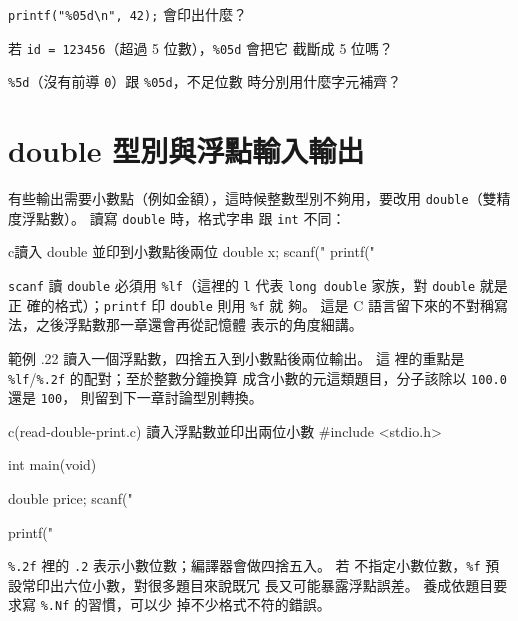 
\begin{drills}[label=drills:basic-width-padding]
\item \texttt{printf("\%05d\textbackslash n", 42);} 會印出什麼？
\item 若 \texttt{id = 123456}（超過 5 位數），\texttt{\%05d} 會把它
截斷成 5 位嗎？
\item \texttt{\%5d}（沒有前導 \texttt{0}）跟 \texttt{\%05d}，不足位數
時分別用什麼字元補齊？
\end{drills}

\section{double 型別與浮點輸入輸出}
\label{sec:basic-double}

有些輸出需要小數點（例如金額），這時候整數型別不夠用，要改用
\texttt{double}（雙精度浮點數）。 讀寫 \texttt{double} 時，格式字串
跟 \texttt{int} 不同：

\begin{code}{c}{讀入 double 並印到小數點後兩位}
double x;
scanf("%
printf("%
\end{code}

\texttt{scanf} 讀 \texttt{double} 必須用 \texttt{\%lf}（這裡的
\texttt{l} 代表 \texttt{long double} 家族，對 \texttt{double} 就是正
確的格式）；\texttt{printf} 印 \texttt{double} 則用 \texttt{\%f} 就
夠。 這是 C 語言留下來的不對稱寫法，之後浮點數那一章還會再從記憶體
表示的角度細講。

範例 \thechapter.22 讀入一個浮點數，四捨五入到小數點後兩位輸出。 這
裡的重點是 \texttt{\%lf}/\texttt{\%.2f} 的配對；至於整數分鐘換算
成含小數的元這類題目，分子該除以 \texttt{100.0} 還是 \texttt{100}，
則留到下一章討論型別轉換。

\begin{example}{c}{(read-double-print.c) 讀入浮點數並印出兩位小數}
#include <stdio.h>

int main(void) {
    double price;
    scanf("%

    printf("%
}
\end{example}


\texttt{\%.2f} 裡的 \texttt{.2} 表示小數位數；編譯器會做四捨五入。 若
不指定小數位數，\texttt{\%f} 預設常印出六位小數，對很多題目來說既冗
長又可能暴露浮點誤差。 養成依題目要求寫 \texttt{\%.Nf} 的習慣，可以少
掉不少格式不符的錯誤。

